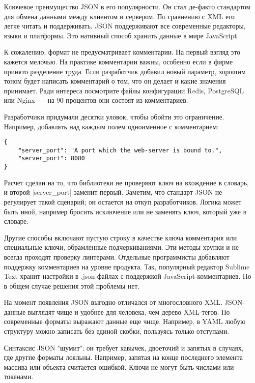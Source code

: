 Ключевое преимущество JSON в его популярности. Он стал де-факто стандартом для
обмена данными между клиентом и сервером. По сравнению с XML его легче читать и
поддерживать. JSON поддерживают все современные редакторы, языки и
платформы. Это нативный способ хранить данные в мире JavaScript.

К сожалению, формат не предусматривает комментарии. На первый взгляд это кажется
мелочью. На практике комментарии важны, особенно если в фирме принято разделение
труда. Если разработчик добавил новый параметр, хорошим тоном будет написать
комментарий о том, что он делает и какие значения принимает. Ради интереса
посмотрите файлы конфигурации Redis, PostgreSQL или Nginx~--- на 90 процентов они
состоят из комментариев.

Разработчики придумали десятки уловок, чтобы обойти это ограничение. Например,
добавлять над каждым полем одноименное с комментарием:

\begin{verbatim}
{
    "server_port": "A port which the web-server is bound to.",
    "server_port": 8080
}
\end{verbatim}

Расчет сделан на то, что библиотеки не проверяют ключ на вхождение в словарь, и
второй \spverb|server_port| заменит первый. Заметим, что стандарт JSON не регулирует
такой сценарий; он остается на откуп разработчиков. Логика может быть иной,
например бросить исключение или не заменять ключ, который уже в словаре.

Другие способы включают пустую строку в качестве ключа комментария или
специальные ключи, обрамленные подчеркиваниями. Эти методы хрупки и не всегда
проходят проверку линтерами. Отдельные программисты добавляют поддержку
комментариев на уровне продукта. Так, популярный редактор Sublime Text хранит
настройки в .json-файлах с поддержкой JavaScript-комментариев. Но в общем случае
решения этой проблемы нет.

На момент появления JSON выгодно отличался от многословного XML. JSON-данные
выглядят чище и удобнее для человека, чем дерево XML-тегов. Но современные
форматы выражают данные еще чище. Например, в YAML любую структуру можно
записать без единой скобки, пользуясь только отступами.

Синтаксис JSON "шумит": он требует кавычек, двоеточий и запятых в случаях, где
другие форматы лояльны. Например, запятая на конце последнего элемента массива
или объекта считается ошибкой. Ключи не могут быть числами или
токенами.

